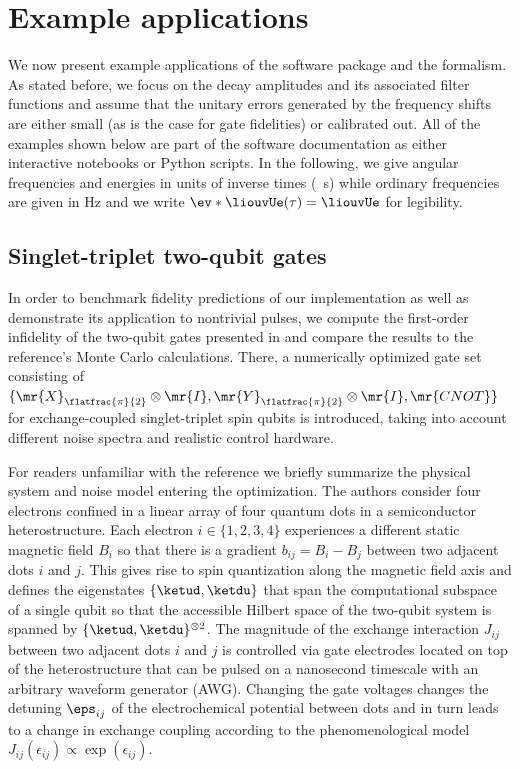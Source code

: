 \section{Example applications}\label{sec:examples}
We now present example applications of the software package and the formalism. As stated before, we focus on the decay amplitudes \decayamps and its associated filter functions and assume that the unitary errors generated by the frequency shifts \freqshifts are either small (as is the case for gate fidelities) or calibrated out. All of the examples shown below are part of the software documentation as either interactive \jupyter notebooks \cite{Kluyver2016} or Python scripts. In the following, we give angular frequencies and energies in units of inverse times (\eg \si{\per\second}) while ordinary frequencies are given in \si{\hertz} and we write $\ev*{\liouvUe(\tau)} = \liouvUe$ for legibility.

\subsection{Singlet-triplet two-qubit gates}\label{sec:examples:optimized_gates}
In order to benchmark fidelity predictions of our implementation as well as demonstrate its application to nontrivial pulses, we compute the first-order infidelity of the two-qubit gates presented in  and compare the results to the reference's Monte Carlo calculations. There, a numerically optimized gate set consisting of $\lbrace\mr{X}_{\flatfrac{\pi}{2}}\otimes\mr{I},\mr{Y}_{\flatfrac{\pi}{2}}\otimes\mr{I},\mr{CNOT}\rbrace$ for exchange-coupled singlet-triplet spin qubits is introduced, taking into account different noise spectra and realistic control hardware.

For readers unfamiliar with the reference we briefly summarize the physical system and noise model entering the optimization. The authors consider four electrons confined in a linear array of four quantum dots in a semiconductor heterostructure. Each electron $i\in\lbrace 1,2,3,4\rbrace$ experiences a different static magnetic field $B_i$ so that there is a gradient $b_{ij} = B_i - B_j$ between two adjacent dots $i$ and $j$. This gives rise to spin quantization along the magnetic field axis and defines the eigenstates $\lbrace\ketud,\ketdu\rbrace$ that span the computational subspace of a single qubit so that the accessible Hilbert space of the two-qubit system is spanned by $\lbrace\ketud,\ketdu\rbrace^{\otimes 2}$. The magnitude of the exchange interaction $J_{ij}$ between two adjacent dots $i$ and $j$ is controlled via gate electrodes located on top of the heterostructure that can be pulsed on a nanosecond timescale with an arbitrary waveform generator (AWG). Changing the gate voltages changes the detuning $\eps_{ij}$ of the electrochemical potential between dots and in turn leads to a change in exchange coupling according to the phenomenological model $J_{ij}(\epsilon_{ij})\propto\exp(\epsilon_{ij})$.

